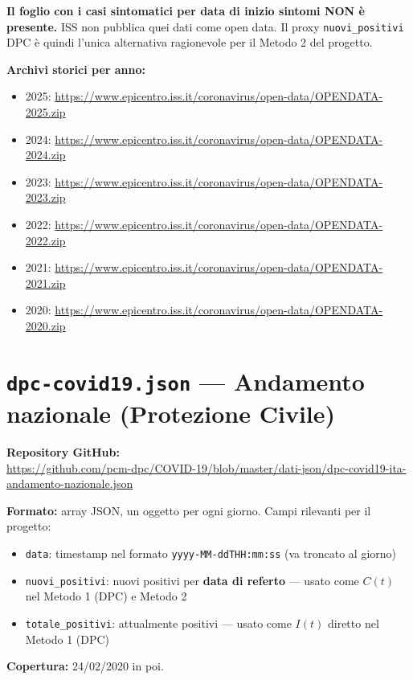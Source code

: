 \documentclass[12pt, a4paper]{article}
\begin{document}
\textbf{Il foglio con i casi sintomatici per data di inizio sintomi NON è
presente.} ISS non pubblica quei dati come open data. Il proxy
\texttt{nuovi\_positivi} DPC è quindi l'unica alternativa ragionevole per il
Metodo 2 del progetto.

\textbf{Archivi storici per anno:}
\begin{itemize}
    \item 2025: \url{https://www.epicentro.iss.it/coronavirus/open-data/OPENDATA-2025.zip}
    \item 2024: \url{https://www.epicentro.iss.it/coronavirus/open-data/OPENDATA-2024.zip}
    \item 2023: \url{https://www.epicentro.iss.it/coronavirus/open-data/OPENDATA-2023.zip}
    \item 2022: \url{https://www.epicentro.iss.it/coronavirus/open-data/OPENDATA-2022.zip}
    \item 2021: \url{https://www.epicentro.iss.it/coronavirus/open-data/OPENDATA-2021.zip}
    \item 2020: \url{https://www.epicentro.iss.it/coronavirus/open-data/OPENDATA-2020.zip}
\end{itemize}

\section{\texttt{dpc-covid19.json} — Andamento nazionale (Protezione Civile)}

\textbf{Repository GitHub:}\\
\url{https://github.com/pcm-dpc/COVID-19/blob/master/dati-json/dpc-covid19-ita-andamento-nazionale.json}

\textbf{Formato:} array JSON, un oggetto per ogni giorno. Campi rilevanti per
il progetto:
\begin{itemize}
    \item \texttt{data}: timestamp nel formato \texttt{yyyy-MM-ddTHH:mm:ss}
          (va troncato al giorno)
    \item \texttt{nuovi\_positivi}: nuovi positivi per \textbf{data di
          referto} — usato come $C(t)$ nel Metodo 1 (DPC) e Metodo 2
    \item \texttt{totale\_positivi}: attualmente positivi — usato come $I(t)$
          diretto nel Metodo 1 (DPC)
\end{itemize}

\textbf{Copertura:} 24/02/2020 in poi.
\end{document}
